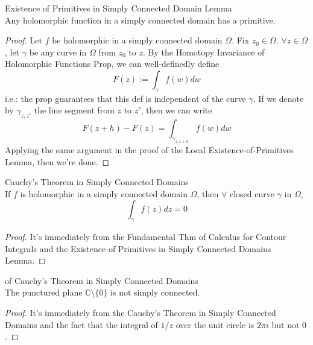 \begin{lemma}{Existence of Primitives in Simply Connected Domain Lemma}\\
Any holomorphic function in a simply connected domain has a primitive.
\end{lemma}

\begin{proof}
    Let $f$ be holomorphic in a simply connected domain $\Omega$. Fix $z_0 \in \Omega$. $\forall z\in \Omega$, let $\gamma$ be any curve in $\Omega$ from $z_0$ to $z$. By the Homotopy Invariance of Holomorphic Functions Prop, we can well-definedly define
    \[
    F(z):= \int_\gamma f(w)dw
    \]
    i.e.: the prop guarantees that this def is independent of the curve $\gamma$. If we denote by $\gamma_{z,z'}$ the line segment from $z$ to $z'$, then we can write
    \[
    F(z+h)- F(z)=\int_{\gamma_{z,z+h}} f(w)dw
    \]
    Applying the same argument in the proof of the Local Existence-of-Primitives Lemma, then we're done.
\end{proof}

\begin{theorem}{Cauchy's Theorem in Simply Connected Domains}\\
If $f$ is holomorphic in a simply connected domain $\Omega$, then $\forall$ closed curve $\gamma$ in $\Omega$,
\[
\int_\gamma f(z)dz=0
\]
\end{theorem}

\begin{proof}
    It's immediately from the Fundamental Thm of Calculus for Contour Integrals and the Existence of Primitives in Simply Connected Domains Lemma.
\end{proof}

\begin{corollary}{of Cauchy's Theorem in Simply Connected Domains}\\
The punctured plane $\mathbb{C} \setminus \{0\}$ is not simply connected.
\end{corollary}

\begin{proof}
    It's immediately from the Cauchy's Theorem in Simply Connected Domains and the fact that the integral of $1/z$ over the unit circle is $2\pi i$ but not $0$.
\end{proof}